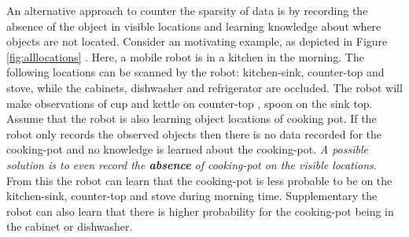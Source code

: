 An alternative approach to counter the sparsity of data is by recording the absence of the object in visible locations and learning knowledge about where objects are not located. Consider an motivating example, as depicted in Figure \ref{fig:alllocations} . Here, a mobile robot is in a kitchen in the morning. The following locations can be scanned by the robot: kitchen-sink, counter-top and stove, while the cabinets, dishwasher and refrigerator are occluded. The robot will make observations of cup and kettle on counter-top , spoon on the sink top. Assume that the robot is also learning object locations of cooking pot. If the robot only records the observed objects then there is no data recorded for the cooking-pot and no knowledge is learned about the cooking-pot. \emph{A possible solution is to even record the \textbf{absence} of cooking-pot on the visible locations}. From this the robot can learn that the cooking-pot is less probable to be on the kitchen-sink, counter-top and stove during morning time. Supplementary the robot can also learn that there is higher probability for the cooking-pot being in the cabinet or dishwasher.

